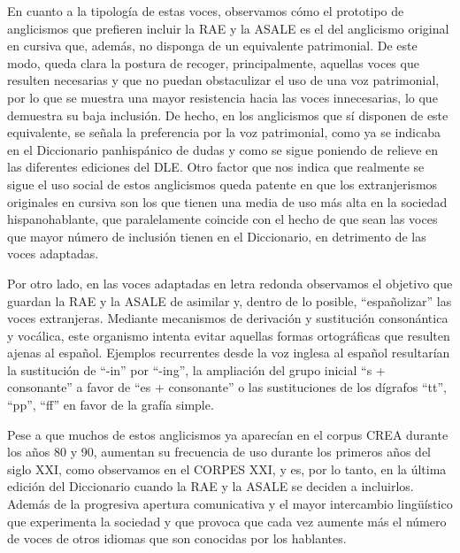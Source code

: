 \documentclass{textolivre}
\begin{document}
En cuanto a la tipología de estas voces, observamos cómo el prototipo de anglicismos que prefieren incluir la RAE y la ASALE es el del anglicismo original en cursiva que, además, no disponga de un equivalente patrimonial. De este modo, queda clara la postura de recoger, principalmente, aquellas voces que resulten necesarias y que no puedan obstaculizar el uso de una voz patrimonial, por lo que se muestra una mayor resistencia hacia las voces innecesarias, lo que demuestra su baja inclusión. De hecho, en los anglicismos que sí disponen de este equivalente, se señala la preferencia por la voz patrimonial, como ya se indicaba en el Diccionario panhispánico de dudas y como se sigue poniendo de relieve en las diferentes ediciones del DLE. Otro factor que nos indica que realmente se sigue el uso social de estos anglicismos queda patente en que los extranjerismos originales en cursiva son los que tienen una media de uso más alta en la sociedad hispanohablante, que paralelamente coincide con el hecho de que sean las voces que mayor número de inclusión tienen en el Diccionario, en detrimento de las voces adaptadas.

Por otro lado, en las voces adaptadas en letra redonda observamos el objetivo que guardan la RAE y la ASALE de asimilar y, dentro de lo posible, “españolizar” las voces extranjeras. Mediante mecanismos de derivación y sustitución consonántica y vocálica, este organismo intenta evitar aquellas formas ortográficas que resulten ajenas al español. Ejemplos recurrentes desde la voz inglesa al español resultarían la sustitución de “-in” por “-ing”, la ampliación del grupo inicial “s + consonante” a favor de “es + consonante” o las sustituciones de los dígrafos “tt”, “pp”, “ff” en favor de la grafía simple.

Pese a que muchos de estos anglicismos ya aparecían en el corpus CREA durante los años 80 y 90, aumentan su frecuencia de uso durante los primeros años del siglo XXI, como observamos en el CORPES XXI, y es, por lo tanto, en la última edición del Diccionario \cite{real2014diccionario} cuando la RAE y la ASALE se deciden a incluirlos. Además de la progresiva apertura comunicativa y el mayor intercambio lingüístico que experimenta la sociedad y que provoca que cada vez aumente más el número de voces de otros idiomas que son conocidas por los hablantes.
\end{document}
